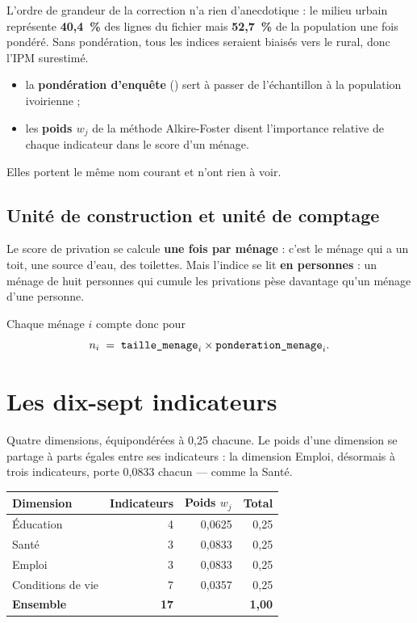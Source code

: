 \documentclass[11pt,a4paper]{article}
\begin{document}
L'ordre de grandeur de la correction n'a rien d'anecdotique : le milieu urbain représente
\textbf{40,4~\%} des lignes du fichier mais \textbf{52,7~\%} de la population une fois pondéré.
Sans pondération, tous les indices seraient biaisés vers le rural, donc l'IPM surestimé.

\begin{retenir}
\begin{itemize}
  \item la \textbf{pondération d'enquête} () sert à passer de
        l'échantillon à la population ivoirienne ;
  \item les \textbf{poids $w_j$} de la méthode Alkire-Foster disent l'importance relative de
        chaque indicateur dans le score d'un ménage.
\end{itemize}
Elles portent le même nom courant et n'ont rien à voir.
\end{retenir}

\subsection{Unité de construction et unité de comptage}

Le score de privation se calcule \textbf{une fois par ménage} : c'est le ménage qui a un toit, une
source d'eau, des toilettes. Mais l'indice se lit \textbf{en personnes} : un ménage de huit
personnes qui cumule les privations pèse davantage qu'un ménage d'une personne.

Chaque ménage $i$ compte donc pour
\[
n_i \;=\; \texttt{taille\_menage}_i \times \texttt{ponderation\_menage}_i .
\]

\section{Les dix-sept indicateurs}

Quatre dimensions, équipondérées à 0,25 chacune. Le poids d'une dimension se partage à parts
égales entre ses indicateurs : la dimension Emploi, désormais à trois indicateurs, porte
0,0833 chacun --- comme la Santé.

\begin{center}
\begin{tabular}{@{}lrrr@{}}
\toprule
\textbf{Dimension} & \textbf{Indicateurs} & \textbf{Poids $w_j$} & \textbf{Total} \\
\midrule
Éducation & 4 & 0,0625 & 0,25 \\
Santé & 3 & 0,0833 & 0,25 \\
Emploi & 3 & 0,0833 & 0,25 \\
Conditions de vie & 7 & 0,0357 & 0,25 \\
\midrule
\textbf{Ensemble} & \textbf{17} & & \textbf{1,00} \\
\bottomrule
\end{tabular}
\end{center}
\end{document}
